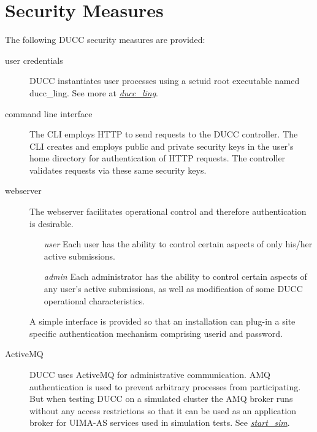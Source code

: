     
    \section{Security Measures}
    The following DUCC security measures are provided:

    \begin{description}
    \item[user credentials] DUCC instantiates user processes using a setuid root executable named ducc\_ling.
    See more at \hyperref[sec:duccling.security]{\em ducc\_ling}.
    \item[command line interface] The CLI employs HTTP to send requests
    to the DUCC controller.  The CLI creates and employs public and private
    security keys in the user's home directory for authentication of HTTP
    requests.  The controller validates requests via these same security keys.
    \item[webserver] The webserver facilitates operational control and
    therefore authentication is desirable. 
    \begin{itemize}
    \item[\textit{user}] Each user has the ability to control certain aspects of
    only his/her active submissions.
    \item[\textit{admin}] Each administrator has the ability to control certain
    aspects of any user's active submissions, as well as modification of some
    DUCC operational characteristics.
    \end{itemize}
    A simple interface is provided so
    that an installation can plug-in a site specific authentication mechanism
    comprising userid and password.
    \item[ActiveMQ] DUCC uses ActiveMQ for administrative communication.
    AMQ authentication is used to prevent arbitrary processes from participating.
    But when testing DUCC on a simulated cluster the AMQ broker runs without any access restrictions 
    so that it can be used as an application broker for UIMA-AS services used in simulation tests. 
    See \hyperref[subsec:sim.start-sim]{{\em start\_sim}}.
    \end{description}
    
